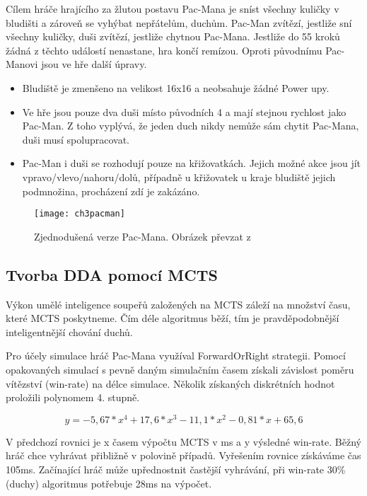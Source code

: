 Cílem hráče hrajícího za žlutou postavu Pac-Mana je sníst všechny kuličky v bludišti a zároveň se vyhýbat nepřátelům, duchům. Pac-Man zvítězí, jestliže sní všechny kuličky, duši zvítězí, jestliže chytnou Pac-Mana. Jestliže do 55 kroků žádná z těchto událostí nenastane, hra končí remízou. Oproti původnímu Pac-Manovi jsou ve hře další úpravy.


\begin{itemize}
	\item Bludiště je zmenšeno na velikost 16x16 a neobsahuje žádné Power upy.
	\item Ve hře jsou pouze dva duši místo původních 4 a mají stejnou rychlost jako Pac-Man. Z toho vyplývá, že jeden duch nikdy nemůže sám chytit Pac-Mana, duši musí spolupracovat.
	\item Pac-Man i duši se rozhodují pouze na křižovatkách. Jejich možné akce jsou jít vpravo/vlevo/nahoru/dolů, případně u křižovatek u kraje bludiště jejich podmnožina, procházení zdí je zakázáno.
\end{itemize}

\begin{figure}
  \centering
  \texttt{[image: ch3pacman]}
	\caption{Zjednodušená verze Pac-Mana. Obrázek převzat z \cite{18Pac1}}
	\label{fig:ch3pacman}
\end{figure}

\subsection{Tvorba DDA pomocí MCTS}

Výkon umělé inteligence soupeřů založených na MCTS záleží na množství času, které MCTS poskytneme. Čím déle algoritmus běží, tím je pravděpodobnější inteligentnější chování duchů.

Pro účely simulace hráč Pac-Mana využíval ForwardOrRight strategii.
Pomocí opakovaných simulací s pevně daným simulačním časem získali závislost poměru vítězství (win-rate) na délce simulace. Několik získaných diskrétních hodnot proložili polynomem 4. stupně.

\begin{equation}
	y=-5,67*x^4+17,6*x^3-11,1*x^2-0,81*x+65,6
\end{equation}

V předchozí rovnici je x časem výpočtu MCTS v ms a y výsledné win-rate.
Běžný hráč chce vyhrávat přibližně v polovině případů. Vyřešením rovnice získáváme čas 105ms. Začínající hráč může upřednostnit častější vyhrávání, při win-rate 30\% (duchy) algoritmus potřebuje 28ms na výpočet.

